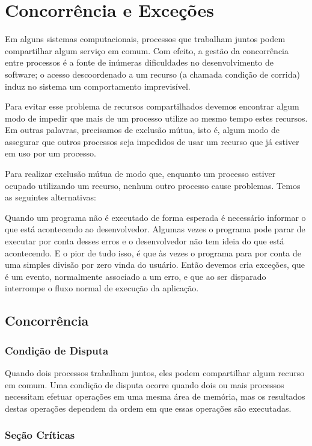\chapter{Concorrência e Exceções}

Em alguns sistemas computacionais, processos que trabalham juntos podem compartilhar algum 
serviço em comum. Com efeito, a gestão da concorrência entre processos é a fonte de inúmeras 
dificuldades no desenvolvimento de software; o acesso descoordenado a um recurso (a chamada 
condição de corrida) induz no sistema um comportamento imprevisível.

Para evitar esse problema de recursos compartilhados devemos encontrar algum modo de impedir 
que mais de um processo utilize ao mesmo tempo estes recursos. Em outras palavras, precisamos 
de exclusão mútua, isto é, algum modo de assegurar que outros processos seja impedidos de usar 
um recurso que já estiver em uso por um processo.

Para realizar exclusão mútua de modo que, enquanto um processo estiver ocupado utilizando um 
recurso, nenhum outro processo cause problemas. Temos as seguintes alternativas:

Quando um programa não é executado de forma esperada é necessário informar o que está acontecendo ao desenvolvedor. Algumas vezes o programa pode parar de executar por conta desses erros e o desenvolvedor não tem ideia do que está acontecendo. E o pior de tudo isso, é que às vezes o programa para por conta de uma simples divisão por zero vinda do usuário. Então devemos cria exceções, que é um evento, normalmente associado a um erro, e que ao ser disparado interrompe o fluxo normal de execução da aplicação.

\section{Concorrência}

\subsection{Condição de Disputa}

Quando dois processos trabalham juntos, eles podem compartilhar algum recurso em comum. Uma condição de disputa ocorre quando dois ou mais processos necessitam efetuar operações em uma mesma área de memória, mas os resultados destas operações dependem da ordem em que essas operações são executadas.

\subsection{Seção Críticas}

